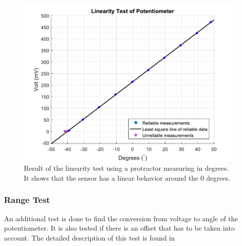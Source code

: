 \begin{figure}[H] 
	\centering 
	\includegraphics[scale=0.5]{figures/linearityOfPotmeterTest2-1}
	\caption{Result of the linearity test using a protractor measuring in degrees. It shows that the sensor has a linear behavior around the 0 degrees.}
	\label{linearityOfPotmeterTest}
\end{figure}


\subsubsection{Range Test}
An additional test is done to find the conversion from voltage to angle of the potentiometer. It is also tested if there is an offset that has to be taken into account. The detailed description of this test is found in 

